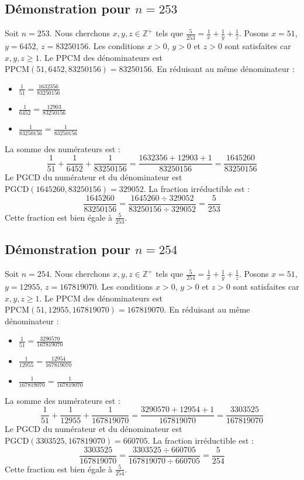 \documentclass[11pt,a4paper]{article}
\begin{document}
\subsection{Démonstration pour $n = 253$}
Soit $n = 253$. Nous cherchons $x, y, z \in \mathbb{Z}^{+}$ tels que $\frac{5}{253} = \frac{1}{x} + \frac{1}{y} + \frac{1}{z}$.
Posons $x = 51$, $y = 6452$, $z = 83250156$.
Les conditions $x > 0$, $y > 0$ et $z > 0$ sont satisfaites car $x, y, z \geq 1$.
Le PPCM des dénominateurs est $\text{PPCM}(51, 6452, 83250156) = 83250156$.
En réduisant au même dénominateur :
\begin{itemize}
    \item $\frac{1}{51} = \frac{1632356}{83250156}$
    \item $\frac{1}{6452} = \frac{12903}{83250156}$
    \item $\frac{1}{83250156} = \frac{1}{83250156}$
\end{itemize}
La somme des numérateurs est :
$$ \frac{1}{51} + \frac{1}{6452} + \frac{1}{83250156} = \frac{1632356 + 12903 + 1}{83250156} = \frac{1645260}{83250156} $$
Le PGCD du numérateur et du dénominateur est $\text{PGCD}(1645260, 83250156) = 329052$.
La fraction irréductible est :
$$ \frac{1645260}{83250156} = \frac{1645260 \div 329052}{83250156 \div 329052} = \frac{5}{253} $$
Cette fraction est bien égale à $\frac{5}{253}$.

\subsection{Démonstration pour $n = 254$}
Soit $n = 254$. Nous cherchons $x, y, z \in \mathbb{Z}^{+}$ tels que $\frac{5}{254} = \frac{1}{x} + \frac{1}{y} + \frac{1}{z}$.
Posons $x = 51$, $y = 12955$, $z = 167819070$.
Les conditions $x > 0$, $y > 0$ et $z > 0$ sont satisfaites car $x, y, z \geq 1$.
Le PPCM des dénominateurs est $\text{PPCM}(51, 12955, 167819070) = 167819070$.
En réduisant au même dénominateur :
\begin{itemize}
    \item $\frac{1}{51} = \frac{3290570}{167819070}$
    \item $\frac{1}{12955} = \frac{12954}{167819070}$
    \item $\frac{1}{167819070} = \frac{1}{167819070}$
\end{itemize}
La somme des numérateurs est :
$$ \frac{1}{51} + \frac{1}{12955} + \frac{1}{167819070} = \frac{3290570 + 12954 + 1}{167819070} = \frac{3303525}{167819070} $$
Le PGCD du numérateur et du dénominateur est $\text{PGCD}(3303525, 167819070) = 660705$.
La fraction irréductible est :
$$ \frac{3303525}{167819070} = \frac{3303525 \div 660705}{167819070 \div 660705} = \frac{5}{254} $$
Cette fraction est bien égale à $\frac{5}{254}$.
\end{document}
